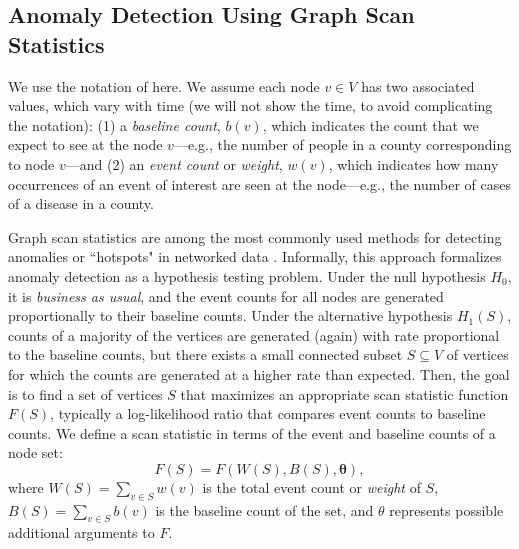 \subsection{Anomaly Detection Using Graph Scan Statistics}
\label{sec:apps-scanstat}

We use the notation of \cite{cadena:sdm17} here. We assume each node $v\in V$ has two associated values,
which vary with time (we will not show the time, to avoid complicating the notation):
(1) a \emph{baseline count}, $b(v)$, which indicates the count that we 
expect to see at the node $v$---e.g., the number of people in a county corresponding to node $v$---and
(2) an \emph{event count} or \emph{weight}, $w(v)$, which indicates how many occurrences of an event 
of interest are seen at the node---e.g., the number of cases of a disease in a county.

Graph scan statistics are among the most commonly used methods for detecting anomalies or ``hotspots" in 
networked data \cite{Speakman-14,leiserson2015pan, hansen2016finding, neil2013scan, chen2014non}. 
Informally, this approach formalizes anomaly detection as a hypothesis testing problem.
Under the null hypothesis $H_0$, it is \emph{business as usual}, and the event counts for all nodes are generated proportionally to their baseline counts. Under the alternative hypothesis $H_1(S)$, counts of a majority of
the vertices are generated (again) with rate proportional to the baseline counts, but there exists a small connected subset
$S \subseteq V$ of vertices for which the counts are generated at a higher rate than expected.
Then, the goal is to find a set of vertices $S$ that maximizes an appropriate scan statistic function $F(S)$, typically a log-likelihood ratio that compares event counts to baseline counts. We define a scan statistic in terms of the event and baseline counts of a node set:
$$
F(S) = F(W(S), B(S), \mathbf{\theta}),
$$
where $W(S) = \sum_{v \in S} w(v)$ is the total event count or \emph{weight} of $S$, $B(S) = \sum_{v \in S} b(v)$ is the baseline count of the set, and $\theta$ represents possible additional arguments to $F$.

